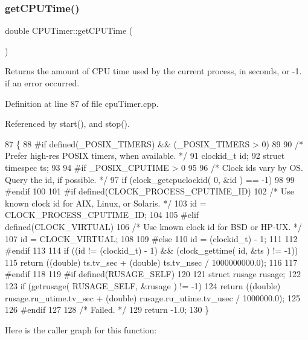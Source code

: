 \subsubsection{\texorpdfstring{get\+C\+P\+U\+Time()}{getCPUTime()}}
{\footnotesize\ttfamily double C\+P\+U\+Timer\+::get\+C\+P\+U\+Time (\begin{DoxyParamCaption}{ }\end{DoxyParamCaption})\hspace{0.3cm}{\ttfamily [private]}}

Returns the amount of C\+PU time used by the current process, in seconds, or -\/1. if an error occurred. 

Definition at line 87 of file cpu\+Timer.\+cpp.



Referenced by start(), and stop().


\begin{DoxyCode}
87                             \{
88 \textcolor{preprocessor}{    #if defined(\_POSIX\_TIMERS) && (\_POSIX\_TIMERS > 0)}
89 
90     \textcolor{comment}{/* Prefer high-res POSIX timers, when available. */}
91     clockid\_t id;
92     \textcolor{keyword}{struct }timespec ts;
93 
94 \textcolor{preprocessor}{    #if \_POSIX\_CPUTIME > 0}
95 
96     \textcolor{comment}{/* Clock ids vary by OS.  Query the id, if possible. */}
97     \textcolor{keywordflow}{if} (clock\_getcpuclockid( 0, &\textcolor{keywordtype}{id} ) == -1)
98 
99 \textcolor{preprocessor}{    #endif}
100 
101 \textcolor{preprocessor}{    #if defined(CLOCK\_PROCESS\_CPUTIME\_ID)}
102     \textcolor{comment}{/* Use known clock id for AIX, Linux, or Solaris. */}
103     \textcolor{keywordtype}{id} = CLOCK\_PROCESS\_CPUTIME\_ID;
104 
105 \textcolor{preprocessor}{    #elif defined(CLOCK\_VIRTUAL)}
106     \textcolor{comment}{/* Use known clock id for BSD or HP-UX. */}
107     \textcolor{keywordtype}{id} = CLOCK\_VIRTUAL;
108 
109 \textcolor{preprocessor}{    #else}
110     \textcolor{keywordtype}{id} = (clockid\_t) - 1;
111 
112 \textcolor{preprocessor}{    #endif}
113 
114     \textcolor{keywordflow}{if} ((\textcolor{keywordtype}{id} != (clockid\_t) - 1) && (clock\_gettime( \textcolor{keywordtype}{id}, &ts ) != -1))
115         \textcolor{keywordflow}{return} ((\textcolor{keywordtype}{double}) ts.tv\_sec + (double) ts.tv\_nsec / 1000000000.0);
116 
117 \textcolor{preprocessor}{    #endif}
118 
119 \textcolor{preprocessor}{    #if defined(RUSAGE\_SELF)}
120 
121     \textcolor{keyword}{struct }rusage rusage;
122 
123     \textcolor{keywordflow}{if} (getrusage( RUSAGE\_SELF, &rusage ) != -1)
124         \textcolor{keywordflow}{return} ((\textcolor{keywordtype}{double}) rusage.ru\_utime.tv\_sec + (double) rusage.ru\_utime.tv\_usec / 1000000.0);
125 
126 \textcolor{preprocessor}{    #endif}
127 
128     \textcolor{comment}{/* Failed. */}
129     \textcolor{keywordflow}{return} -1.0;
130 \}
\end{DoxyCode}
Here is the caller graph for this function\+:
\mbox{\label{class_c_p_u_timer_a9547512dbcec01ea685d291569a87aa4}} 

